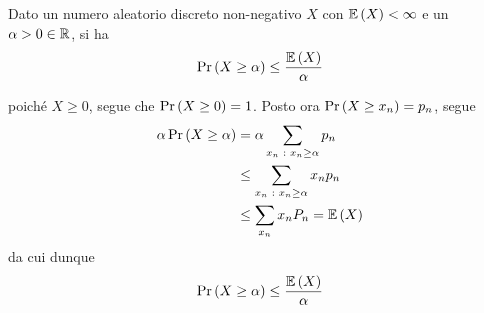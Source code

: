 \documentclass{subfiles}
\begin{document}
\begin{Theorem}
    Dato un numero aleatorio discreto non-negativo \(X\) con \(\Expected{X} < \infty\) e un \(\alpha > 0 \in \operatorname{\mathbb{R}}\), si ha
    \[
        \Prob{X \ge \alpha} \le \Frac{\Expected{X}}{\alpha}
    \]
    \begin{Proof*}
        poiché \(X \ge 0\), segue che \(\Prob{X \ge 0} = 1\). Posto ora \(\Prob{X \ge x_{n}} = p_{n}\), segue
        \[\begin{aligned}
                \alpha \Prob{X \ge \alpha} & = \alpha \Sum{p_{n}}{x_{n} \Such x_{n} \ge \alpha} \\
                                           & \le \Sum{x_{n}p_{n}}{x_{n} \Such x_{n} \ge \alpha} \\
                                           & \le \Sum{x_{n} P_{n}}{x_{n}} = \Expected{X}
            \end{aligned}\]
        da cui dunque
        \[
            \Prob{X \ge \alpha} \le \Frac{\Expected{X}}{\alpha}
        \]
    \end{Proof*}
\end{Theorem}
\end{document}
